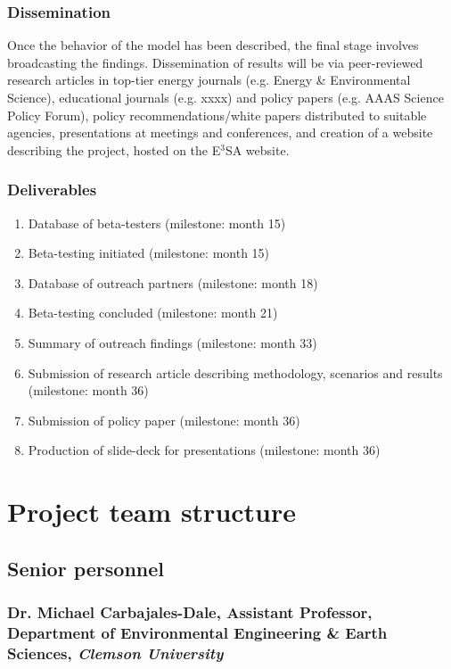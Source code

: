 \documentclass[11pt,a4paper]{article}
\begin{document}
\subsubsection{Dissemination}

Once the behavior of the model has been described, 
the final stage involves broadcasting the findings. 
Dissemination of results will be via 
peer-reviewed research articles in top-tier energy journals 
(e.g. Energy \& Environmental Science),
educational journals (e.g. xxxx) and 
policy papers (e.g. AAAS Science Policy Forum), 
policy recommendations/white papers distributed to suitable agencies, 
presentations at meetings and conferences, and 
creation of a website describing the project, hosted on the E$^3$SA website.

\subsubsection{Deliverables}
\begin{enumerate}
\vspace{-9pt}
\setlength{\itemsep}{-3pt}
\setcounter{enumi}{13}
	\item	Database of beta-testers (milestone: month 15)
	\item	Beta-testing initiated (milestone: month 15)
	\item	Database of outreach partners (milestone: month 18)
	\item	Beta-testing concluded (milestone: month 21)
	\item	Summary of outreach findings (milestone: month 33)
	\item 	Submission of research article describing 
				methodology, scenarios and results (milestone: month 36)
	\item 	Submission of policy paper (milestone: month 36)
	\item 	Production of slide-deck for presentations (milestone: month 36)
\end{enumerate}

\section{Project team structure}

\subsection{Senior personnel}


\subsubsection{Dr. Michael Carbajales-Dale, Assistant Professor, Department of Environmental Engineering \& Earth Sciences, \emph{Clemson University}}
\end{document}
